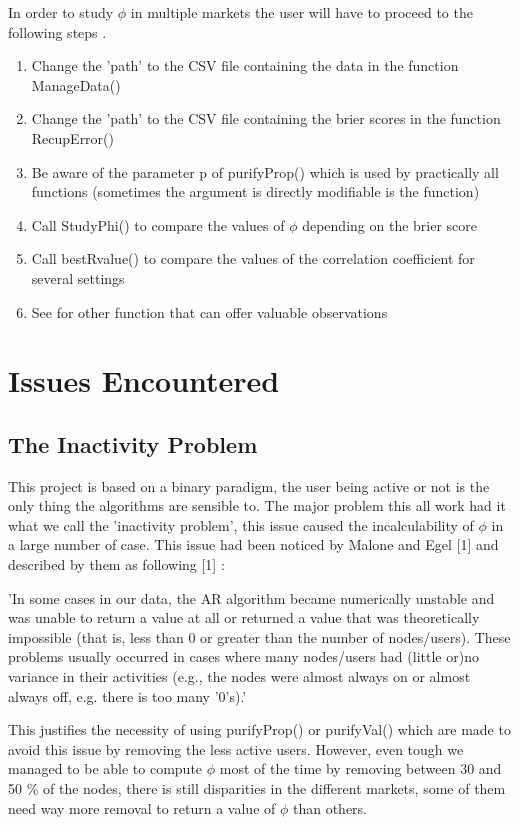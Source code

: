 \documentclass{report}
\begin{document}
In order to study $\phi $ in multiple markets the user will have to proceed to the following steps .
\begin{enumerate}
\item Change the 'path' to the CSV file containing the data in the function ManageData()
\item Change the 'path' to the CSV file containing the brier scores in the function RecupError()
\item Be aware of the parameter p of purifyProp() which is used by practically all functions (sometimes the argument is directly modifiable is the function)
\item Call StudyPhi() to compare the values of $\phi $ depending on the brier score
\item Call bestRvalue() to compare the values of the correlation coefficient for several settings
\item See for other function that can offer valuable observations
\end{enumerate}

\chapter{Issues Encountered}
\section{The Inactivity Problem}

This project is based on a binary paradigm, the user being active or not is the only thing the algorithms are sensible to. The major problem this all work had it what we call the 'inactivity problem', this issue caused the incalculability of $\phi $ in a large number of case. This issue had been noticed by Malone and Egel [1] and described by them as following [1] : 

'In some cases in our data, the AR algorithm became numerically unstable and was unable to return a value at all or returned a value that was theoretically impossible (that is, less than 0 or greater than the number of nodes/users). These problems usually occurred in cases where many nodes/users had (little or)no variance in their activities (e.g., the nodes were almost always on or almost always off, e.g. there is too many '0's).'

This justifies the necessity of using purifyProp() or purifyVal() which are made to avoid this issue by removing the less active users. However, even tough we managed to be able to compute $\phi $ most of the time by removing between 30 and 50 \% of the nodes, there is still disparities in the different markets, some of them need way more removal to return a value of  $\phi $ than others. 
\end{document}
